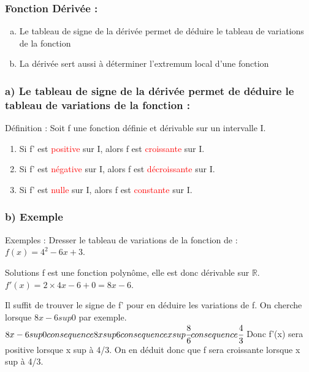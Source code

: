 \documentclass[t]{beamer}
\begin{document}
	\begin{frame}[label=pagebanale]
		\frametitle{Fonction Dérivée :}
		\pause
		\begin{enumerate}[a)]
			\item<+-> Le tableau de signe de la dérivée permet de déduire le tableau de variations de la fonction
			\item<+-> La dérivée sert aussi à déterminer l'extremum local d'une fonction
		\end{enumerate}
	\end{frame}

	\begin{frame}[label=pagebanale]
		\frametitle{a) Le tableau de signe de la dérivée permet de déduire le tableau de variations de la fonction : }
		\pause
		\begin{block}{Définition :}
		\pause
		Soit f une fonction définie et dérivable sur un intervalle I. \pause
		\begin{enumerate}[]
			\item<+-> Si f' est \textcolor{red}{positive} sur I, \pause alors f est \textcolor{red}{croissante} sur I. \pause
			\item<+-> Si f' est \textcolor{red}{négative} sur I, \pause alors f est \textcolor{red}{décroissante} sur I. \pause
			\item<+-> Si f' est \textcolor{red}{nulle} sur I, \pause alors f est \textcolor{red}{constante} sur I.
		\end{enumerate}
		\pause
		\end{block}
	\end{frame}

	\begin{frame}[label=pagebanale]
		\frametitle{b) Exemple}
		\begin{block}{Exemples : }
			Dresser le tableau de variations de la fonction de : $f(x) = 4^2 - 6x + 3$. 
		\end{block}
		\begin{block}{Solutions }
			f est une fonction polynôme, elle est donc dérivable sur $\mathbb{R}$. $f'(x) = 2 \times 4 x - 6 + 0 = 8x - 6$.
			
			\pause
			Il suffit de trouver le signe de f' pour en déduire les variations de f. On cherche lorsque $ 8x - 6 sup 0$ par exemple.
			$ 8x - 6 sup 0 consequence 8x  sup 6 consequence x sup \cfrac{8}{6} consequence \cfrac{4}{3}$ Donc f'(x) sera positive lorsque x sup à 4/3. On en déduit donc que f sera croissante lorsque x sup à 4/3. 
		\end{block}
	\end{frame}
\end{document}

